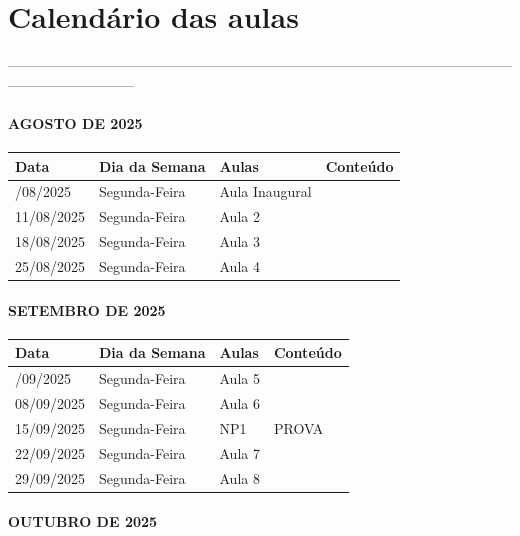 \documentclass[
]{book}
\theoremstyle{definition}
\theoremstyle{definition}
\theoremstyle{definition}
\theoremstyle{definition}
\theoremstyle{remark}
\begin{document}
\section{Calendário das aulas}\label{calenduxe1rio-das-aulas}

---------------------------------------------------------------------------------------------------------------------------------------

\paragraph{AGOSTO DE 2025}\label{agosto-de-2025}

\begin{longtable}[]{@{}llll@{}}
\toprule\noalign{}
Data & Dia da Semana & Aulas & Conteúdo \\
\midrule\noalign{}
\endhead
\bottomrule\noalign{}
\endlastfoot
04/08/2025 & Segunda-Feira & Aula Inaugural & \\
11/08/2025 & Segunda-Feira & Aula 2 & \\
18/08/2025 & Segunda-Feira & Aula 3 & \\
25/08/2025 & Segunda-Feira & Aula 4 & \\
\end{longtable}

\paragraph{SETEMBRO DE 2025}\label{setembro-de-2025}

\begin{longtable}[]{@{}llll@{}}
\toprule\noalign{}
Data & Dia da Semana & Aulas & Conteúdo \\
\midrule\noalign{}
\endhead
\bottomrule\noalign{}
\endlastfoot
01/09/2025 & Segunda-Feira & Aula 5 & \\
08/09/2025 & Segunda-Feira & Aula 6 & \\
15/09/2025 & Segunda-Feira & NP1 & PROVA \\
22/09/2025 & Segunda-Feira & Aula 7 & \\
29/09/2025 & Segunda-Feira & Aula 8 & \\
\end{longtable}

\paragraph{OUTUBRO DE 2025}\label{outubro-de-2025}
\end{document}
